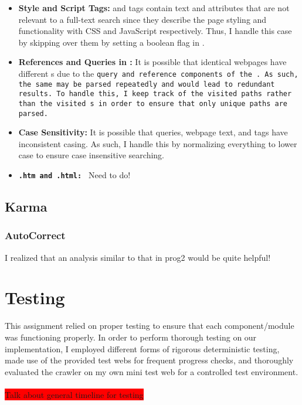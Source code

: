 \documentclass[11pt]{article}
\begin{document}
\begin{itemize}
	\item \textbf{Style and Script Tags: } \style{} and \script{} tags contain text and attributes that are not relevant to a full-text search since they describe the page styling and functionality with CSS and JavaScript respectively. Thus, I handle this case by skipping over them by setting a boolean flag in \hoe{}.
	\item \textbf{References and Queries in \URL: } It is possible that identical webpages have different \URL s due to the \tt{query} and \tt{reference} components of the \URL. As such, the same \URL may be parsed repeatedly and would lead to redundant results. To handle this, I keep track of the visited \tt{path}s rather than the visited \URL s in order to ensure that only unique paths are parsed.
	\item \textbf{Case Sensitivity: } It is possible that queries, webpage text, and tags have inconsistent casing. As such, I handle this by normalizing everything to lower case to ensure case insensitive searching.
	\item \textbf{\tt{.htm} and \tt{.html}: } Need to do!
\end{itemize}

\iffalse
some useful points to talk about 
\begin{itemize}
	\item choice to skip over style and script tags
	\item choice of data strcutures
	\item my implementation doesn't rely on the spaces between words and operators
	\item Discuss how you dealt with implicit AND. chose not to parenthesize when having multiple in a row
\end{itemize}
\fi


\subsection{Karma}
\subsubsection{AutoCorrect}
I realized that an analysis similar to that in prog2 would be quite helpful!

\section{Testing}
This assignment relied on proper testing to ensure that each component/module was functioning properly. In order to perform thorough testing on our implementation, I employed different forms of rigorous deterministic testing, made use of the provided test webs for frequent progress checks, and thoroughly evaluated the crawler on my own mini test web for a controlled test environment.\\ \\
\colorbox{red}{ Talk about general timeline for testing}
\end{document}
